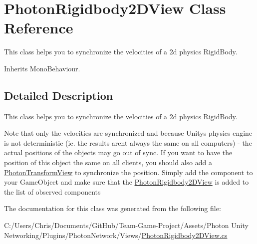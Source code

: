 \hypertarget{class_photon_rigidbody2_d_view}{}\section{Photon\+Rigidbody2\+D\+View Class Reference}
\label{class_photon_rigidbody2_d_view}


This class helps you to synchronize the velocities of a 2d physics Rigid\+Body.  




Inherits Mono\+Behaviour.



\subsection{Detailed Description}
This class helps you to synchronize the velocities of a 2d physics Rigid\+Body. 

Note that only the velocities are synchronized and because Unitys physics engine is not deterministic (ie. the results aren\textquotesingle{}t always the same on all computers) -\/ the actual positions of the objects may go out of sync. If you want to have the position of this object the same on all clients, you should also add a \hyperlink{class_photon_transform_view}{Photon\+Transform\+View} to synchronize the position. Simply add the component to your Game\+Object and make sure that the \hyperlink{class_photon_rigidbody2_d_view}{Photon\+Rigidbody2\+D\+View} is added to the list of observed components 

The documentation for this class was generated from the following file\+:\begin{DoxyCompactItemize}
\item 
C\+:/\+Users/\+Chris/\+Documents/\+Git\+Hub/\+Team-\/\+Game-\/\+Project/\+Assets/\+Photon Unity Networking/\+Plugins/\+Photon\+Network/\+Views/\hyperlink{_photon_rigidbody2_d_view_8cs}{Photon\+Rigidbody2\+D\+View.\+cs}\end{DoxyCompactItemize}
